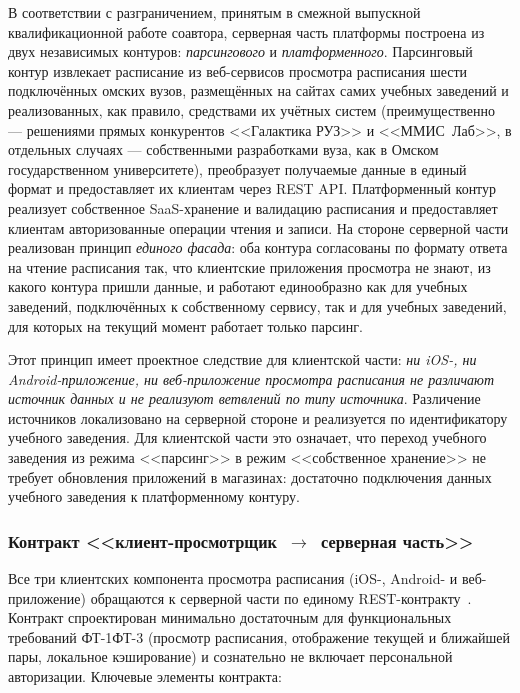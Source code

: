 В соответствии с разграничением, принятым в смежной выпускной квалификационной работе соавтора, серверная часть платформы построена из двух независимых контуров: \emph{парсингового} и \emph{платформенного}. Парсинговый контур извлекает расписание из веб-сервисов просмотра расписания шести подключённых омских вузов, размещённых на сайтах самих учебных заведений и реализованных, как правило, средствами их учётных систем (преимущественно --- решениями прямых конкурентов <<Галактика РУЗ>> и <<ММИС~Лаб>>, в отдельных случаях --- собственными разработками вуза, как в Омском государственном университете), преобразует получаемые данные в единый формат и предоставляет их клиентам через REST API. Платформенный контур реализует собственное SaaS-хранение и валидацию расписания и предоставляет клиентам авторизованные операции чтения и записи. На стороне серверной части реализован принцип \emph{единого фасада}: оба контура согласованы по формату ответа на чтение расписания так, что клиентские приложения просмотра не знают, из какого контура пришли данные, и работают единообразно как для учебных заведений, подключённых к собственному сервису, так и для учебных заведений, для которых на текущий момент работает только парсинг.

Этот принцип имеет проектное следствие для клиентской части: \emph{ни iOS-, ни Android-приложение, ни веб-приложение просмотра расписания не различают источник данных и не реализуют ветвлений по типу источника}. Различение источников локализовано на серверной стороне и реализуется по идентификатору учебного заведения. Для клиентской части это означает, что переход учебного заведения из режима <<парсинг>> в режим <<собственное хранение>> не требует обновления приложений в магазинах: достаточно подключения данных учебного заведения к платформенному контуру.

\subsubsection{Контракт <<клиент-просмотрщик~$\to$~серверная часть>>}
\label{subsubsec:read-contract}

Все три клиентских компонента просмотра расписания (iOS-, Android- и веб-приложение) обращаются к серверной части по единому REST-контракту~\cite{fielding-rest}. Контракт спроектирован минимально достаточным для функциональных требований ФТ-1\textendash{}ФТ-3 (просмотр расписания, отображение текущей и ближайшей пары, локальное кэширование) и сознательно не включает персональной авторизации. Ключевые элементы контракта:

